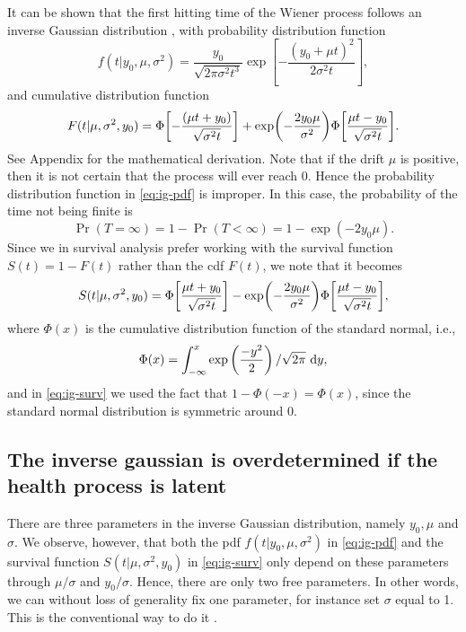It can be shown that the first hitting time of the Wiener process follows an inverse Gaussian distribution \citep{chhikara1988}, with probability distribution function
\begin{equation}
\label{eq:ig-pdf}
    f(t|y_0,\mu,\sigma^2)=\frac{y_0}{\sqrt{2\pi\sigma^2t^3}}\exp\left[-\frac{(y_0+\mu t)^2}{2\sigma^2t}\right],
\end{equation}
and cumulative distribution function
\begin{equation}
\label{eq:ig-cdf}
    F(t|\mu,\sigma^2,y_0)=\Phi\sqb*{-\frac{(\mu t+y_0)}{\sqrt{\sigma^2t}}}+\exp\p*{-\frac{2y_0\mu}{\sigma^2}}\Phi\sqb*{\frac{\mu t-y_0}{\sqrt{\sigma^2t}}}.
\end{equation}
See Appendix  for the mathematical derivation. Note that if the drift $\mu$ is positive, then it is not certain that the process will ever reach 0. Hence the probability distribution function in \eqref{eq:ig-pdf} is improper. In this case, the probability of the time not being finite is \citep{cox1965}
\begin{equation*}
    \Pr{}(T=\infty)=1-\Pr{}(T<\infty)=1-\exp{(-2y_0\mu)}.
\end{equation*}
Since we in survival analysis prefer working with the survival function $S(t)=1-F(t)$ rather than the cdf $F(t)$, we note that it becomes
\begin{equation}
\label{eq:ig-surv}
    S(t|\mu,\sigma^2,y_0)=\Phi\sqb*{\frac{\mu t+y_0}{\sqrt{\sigma^2t}}}-\exp\p*{-\frac{2y_0\mu}{\sigma^2}}\Phi\sqb*{\frac{\mu t-y_0}{\sqrt{\sigma^2t}}},
\end{equation}
where $\Phi(x)$ is the cumulative distribution function of the standard normal, i.e.,
\begin{equation}
    \Phi(x)=\int_{-\infty}^x\exp\left(\frac{-y^2}{2}\right)/\sqrt{2\pi}\text{~d}y,
\end{equation}
and in \eqref{eq:ig-surv} we used the fact that $1-\Phi(-x)=\Phi(x)$, since the standard normal distribution is symmetric around 0.

\subsection{The inverse gaussian is overdetermined if the health process is latent}
There are three parameters in the inverse Gaussian distribution, namely $y_0, \mu$ and $\sigma$. We observe, however, that both the pdf $f(t|y_0,\mu,\sigma^2)$ in \eqref{eq:ig-pdf} and the survival function $S(t|\mu,\sigma^2,y_0)$ in \eqref{eq:ig-surv} only depend on these parameters through $\mu/\sigma$ and $y_0/\sigma$. Hence, there are only two free parameters. In other words, we can without loss of generality fix one parameter, for instance set $\sigma$ equal to 1. This is the conventional way to do it \citep{leewhitmore2006}.

